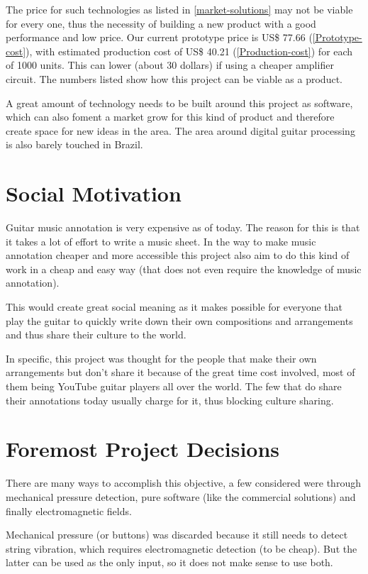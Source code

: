 The price for such technologies as listed in \autoref{market-solutions} may not be viable for every one,
thus the necessity of building a new product with a good performance and low price.
Our current prototype price is US\$ 77.66 (\autoref{Prototype-cost}), with estimated
production cost of US\$ 40.21 (\autoref{Production-cost}) for each of 1000 units. This can lower (about 30 dollars) if using
a cheaper amplifier circuit. The numbers listed show how this project can be viable
as a product. 

A great amount of technology needs to be built around this project as software, which
can also foment a market grow for this kind of product and therefore create space for
new ideas in the area. The area around digital guitar processing is also barely touched
in Brazil.

\section{Social Motivation}
Guitar music annotation is very expensive as of today. The reason for this is that
it takes a lot of effort to write a music sheet. In the way to make music annotation
cheaper and more accessible this project also aim to do this kind of work in a cheap
and easy way (that does not even require the knowledge of music annotation). 

This would create great social meaning as it makes possible for everyone that play
the guitar to quickly write down their own compositions and arrangements and thus
share their culture to the world. 

In specific, this project was thought for the people that make their own arrangements
but don't share it because of the great time cost involved, most of them being YouTube
guitar players all over the world. The few that do share their annotations today usually
charge for it, thus blocking culture sharing. 


\section{Foremost Project Decisions}
There are many ways to accomplish this objective, a few considered were through
mechanical pressure detection, pure software (like the commercial solutions) and
finally electromagnetic fields. 

Mechanical pressure (or buttons) was discarded because it still needs to detect
string vibration, which requires electromagnetic detection (to be cheap). But the latter can
be used as the only input, so it does not make sense to use both. 

